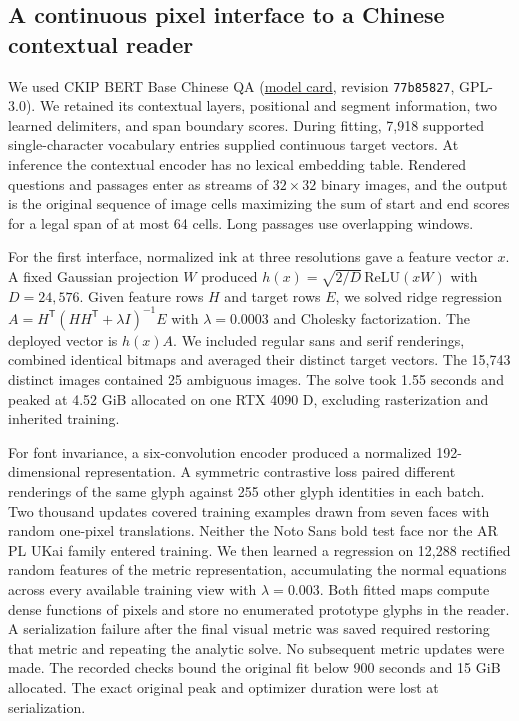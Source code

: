 \subsection*{A continuous pixel interface to a Chinese contextual reader}
We used CKIP BERT Base Chinese QA (\href{https://huggingface.co/ckiplab/bert-base-chinese-qa}{model card}, revision \texttt{77b85827}, GPL-3.0). We retained its contextual layers, positional and segment information, two learned delimiters, and span boundary scores. During fitting, 7,918 supported single-character vocabulary entries supplied continuous target vectors. At inference the contextual encoder has no lexical embedding table. Rendered questions and passages enter as streams of $32\times32$ binary images, and the output is the original sequence of image cells maximizing the sum of start and end scores for a legal span of at most 64 cells. Long passages use overlapping windows.

For the first interface, normalized ink at three resolutions gave a feature vector $x$. A fixed Gaussian projection $W$ produced $h(x)=\sqrt{2/D}\,\mathrm{ReLU}(xW)$ with $D=24{,}576$. Given feature rows $H$ and target rows $E$, we solved ridge regression $A=H^{\mathsf T}(HH^{\mathsf T}+\lambda I)^{-1}E$ with $\lambda=0.0003$ and Cholesky factorization. The deployed vector is $h(x)A$. We included regular sans and serif renderings, combined identical bitmaps and averaged their distinct target vectors. The 15,743 distinct images contained 25 ambiguous images. The solve took 1.55 seconds and peaked at 4.52 GiB allocated on one RTX 4090 D, excluding rasterization and inherited training.

For font invariance, a six-convolution encoder produced a normalized 192-dimensional representation. A symmetric contrastive loss paired different renderings of the same glyph against 255 other glyph identities in each batch. Two thousand updates covered training examples drawn from seven faces with random one-pixel translations. Neither the Noto Sans bold test face nor the AR PL UKai family entered training. We then learned a regression on 12,288 rectified random features of the metric representation, accumulating the normal equations across every available training view with $\lambda=0.003$. Both fitted maps compute dense functions of pixels and store no enumerated prototype glyphs in the reader. A serialization failure after the final visual metric was saved required restoring that metric and repeating the analytic solve. No subsequent metric updates were made. The recorded checks bound the original fit below 900 seconds and 15 GiB allocated. The exact original peak and optimizer duration were lost at serialization.


